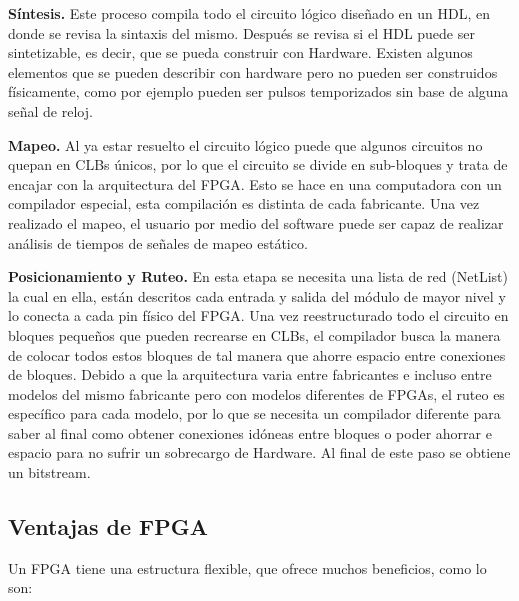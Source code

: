 \documentclass[twoside,spanish,ESP,MSc]{plantillaLabUPV}
\theoremstyle{definition}
\newcommand{\f}{FPGA }
\begin{document}
\checkmark\textbf{Síntesis.} Este proceso compila todo el circuito lógico diseñado en un HDL, en donde se revisa la sintaxis del mismo. Después se revisa si el HDL puede ser sintetizable, es decir, que se pueda construir con Hardware. Existen algunos elementos que se pueden describir con hardware pero no pueden ser construidos físicamente, como por ejemplo pueden ser pulsos temporizados sin base de alguna señal de reloj.

\checkmark\textbf{Mapeo.} Al ya estar resuelto el circuito lógico puede que algunos circuitos no quepan en CLBs únicos, por lo que el circuito se divide en sub-bloques y trata de encajar con la arquitectura del FPGA. Esto se hace en una computadora con un compilador especial, esta compilación es distinta de cada fabricante. Una vez realizado el mapeo, el usuario por medio del software puede ser capaz de realizar análisis de tiempos de señales de mapeo estático.

\checkmark\textbf{Posicionamiento y Ruteo.} En esta etapa se necesita una lista de red (NetList) la cual en ella, están descritos cada entrada y salida del módulo de mayor nivel y lo conecta a cada pin físico del FPGA.
Una vez reestructurado todo el circuito en bloques pequeños que pueden recrearse en CLBs, el compilador busca la manera de colocar todos estos bloques de tal manera que ahorre espacio entre conexiones de bloques. Debido a que la arquitectura varia entre fabricantes e incluso entre modelos del mismo fabricante pero con modelos diferentes de FPGAs, el ruteo es específico para cada modelo, por lo que se necesita un compilador diferente para saber al final como obtener conexiones idóneas entre bloques o poder ahorrar e espacio para no sufrir un sobrecargo de Hardware. Al final de este paso se obtiene un bitstream. %
%


\subsection{Ventajas de \f}
Un \f tiene una estructura flexible, que ofrece muchos beneficios, como lo son:

%
\end{document}
